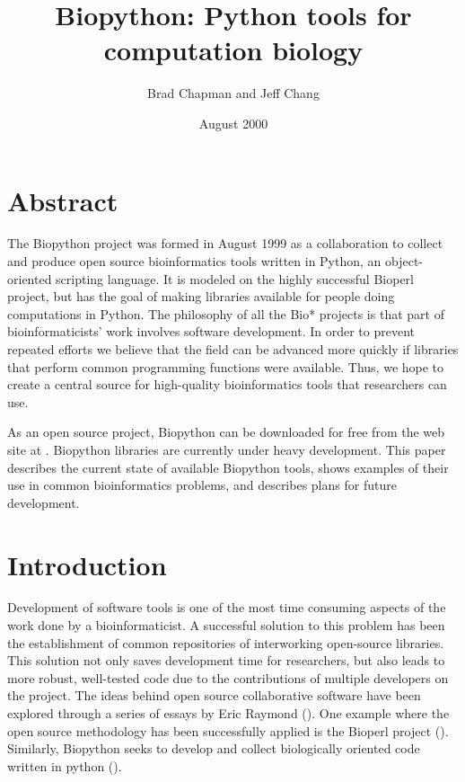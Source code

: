 \documentclass[dvips]{article}
\begin{document}
\title{Biopython: Python tools for computation biology}
\author{Brad Chapman and Jeff Chang}
\date{August 2000}

\maketitle
\tableofcontents

\section{Abstract}

The Biopython project was formed in August 1999 as a collaboration to collect and produce open source bioinformatics tools written in Python, an object-oriented scripting language.  It is modeled on the highly successful Bioperl project, but has the goal of making libraries available for people doing computations in Python.  The philosophy of all the Bio* projects is that part of bioinformaticists' work involves software development.  In order to prevent repeated efforts we believe that the field can be advanced more quickly if libraries that perform common programming functions were available. Thus, we hope to create a central source for high-quality bioinformatics tools that researchers can use. 


As an open source project, Biopython can be downloaded for free from the web site at . Biopython libraries are currently under heavy development. This paper describes the current state of available Biopython tools, shows examples of their use in common bioinformatics problems, and describes plans for future development.

\section{Introduction}


Development of software tools is one of the most time consuming aspects of the work done by a bioinformaticist. A successful solution to this problem has been the establishment of common repositories of interworking open-source libraries. This solution not only saves development time for researchers, but also leads to more robust, well-tested code due to the contributions of multiple developers on the project. The ideas behind open source collaborative software have been explored through a series of essays by Eric Raymond (). One example where the open source methodology has been successfully applied is the Bioperl project (). Similarly, Biopython seeks to develop and collect biologically oriented code written in python ().
\end{document}
